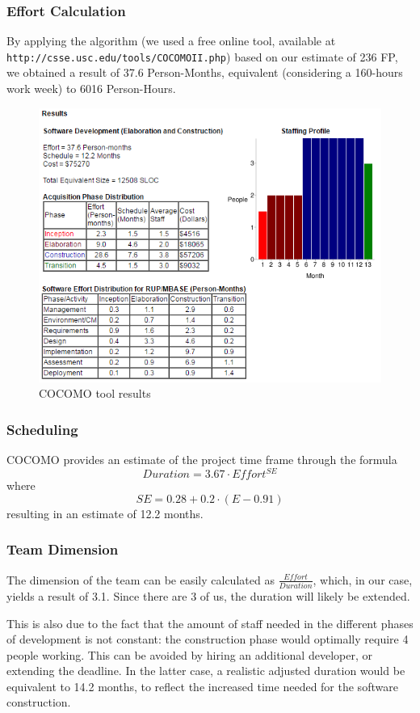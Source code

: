 \subsubsection{Effort Calculation}
By applying the algorithm (we used a free online tool, available at \\\texttt{http://csse.usc.edu/tools/COCOMOII.php}) based on our estimate of 236 FP, we obtained a result of 37.6 Person-Months, equivalent (considering a 160-hours work week) to 6016 Person-Hours.
\begin{figure}[h]
	\centering
	\includegraphics[width=\textwidth]{Images/COCOMO}
	\caption{COCOMO tool results}
\end{figure}

\subsubsection{Scheduling}
COCOMO provides an estimate of the project time frame through the formula $$ Duration = 3.67 \cdot Effort^{SE} $$ where $$ SE = 0.28 + 0.2 \cdot (E - 0.91) $$
resulting in an estimate of 12.2 months.

\subsubsection{Team Dimension}
The dimension of the team can be easily calculated as $\frac{Effort}{Duration}$, which, in our case, yields a result of 3.1. Since there are 3 of us, the duration will likely be extended.

This is also due to the fact that the amount of staff needed in the different phases of development is not constant: the construction phase would optimally require 4 people working. This can be avoided by hiring an additional developer, or extending the deadline. In the latter case, a realistic adjusted duration would be equivalent to 14.2 months, to reflect the increased time needed for the software construction.